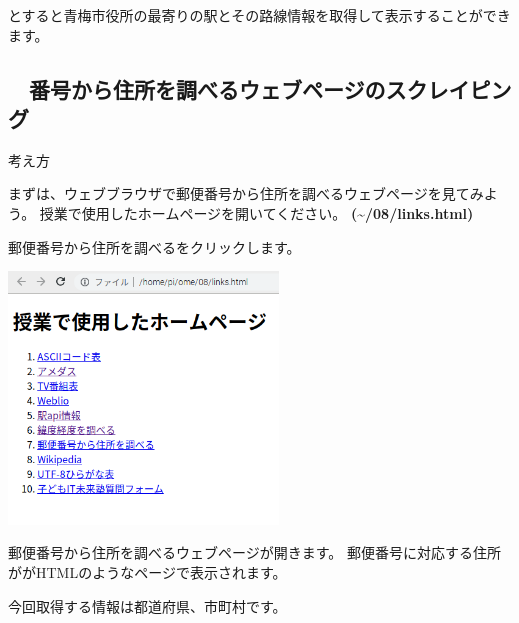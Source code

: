 \bigskip


とすると青梅市役所の最寄りの駅とその路線情報を取得して表示することができます。


\bigskip

\clearpage\subsection*{\theExercise　番号から住所を調べるウェブページのスクレイピング}
\addtocounter{Exercise}{-1}\label{E:postNum}
考え方

まずは、ウェブブラウザで郵便番号から住所を調べるウェブページを見てみよう。
授業で使用したホームページを開いてください。
\textbf{({\textasciitilde}/08/links.html)}

郵便番号から住所を調べるをクリックします。




\begin{center}
\includegraphics[width=7.181cm]{./text08-img/textbook-img017.png}

\end{center}

\bigskip


\bigskip

郵便番号から住所を調べるウェブページが開きます。
郵便番号に対応する住所ががHTMLのようなページで表示されます。

今回取得する情報は都道府県、市町村です。



